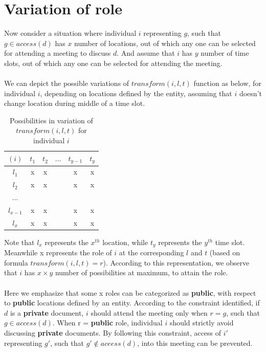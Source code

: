 \section{Variation of role}
\noindent
Now consider a situation where individual $i$ representing $g$, such that $g \in access(d)$ has $x$ number of locations, out of which any one can be selected for attending a meeting to discuss $d$. And assume that $i$ has $y$ number of time slots, out of which any one can be selected for attending the meeting.\\ \\
We can depict the possible variations of $transform(i, l, t)$ function as below, for individual $i$, depending on locations defined by the entity, assuming that $i$ doesn't change location during middle of a time slot.
\begin{table}[H]
    \centering
    \begin{tabular}{|c|c|c|c|c|c|}
    \hline
    $(i)$ & $t_1$ & $t_2$ & $...$ & $t_{y-1}$ & $t_{y}$ \\
    \hline
    $l_1$ & x & x & \  & x & x \\
    \hline
    $l_2$ & x & x & \  & x & x \\
    \hline
    $...$ & \  & \  & \  & \  & \  \\
    \hline
    $l_{x-1}$ & x & x & \  & x & x \\
    \hline
    $l_{x}$ & x & x & \  & x & x \\
    \hline
    \end{tabular}
    \caption{Possibilities in variation of $transform(i,l,t)$ for individual $i$}
    \label{tab:six_columns_six_rows}
\end{table}

\noindent
Note that $l_x$ represents the $x^{th}$ location, while $t_y$ represents the $y^{th}$ time slot. Meanwhile x represents the role of $i$ at the corresponding $l$ and $t$ (based on formula $transform(i, l, t) = r$). According to this representation, we observe that $i$ has $x \times y$ number of possibilities at maximum, to attain the role.\\ \\
Here we emphasize that some x roles can be categorized as \textbf{public}, with respect to \textbf{public} locations defined by an entity. According to the constraint identified, if $d$ is a \textbf{private} document, $i$ should attend the meeting only when $r = g$, such that $g \in access(d)$. When r = \textbf{public} role, individual $i$ should strictly avoid discussing \textbf{private} documents. By following this constraint, access of $i'$ representing $g'$, such that $g' \notin aceess(d)$, into this meeting can be prevented.\\ \\ 

